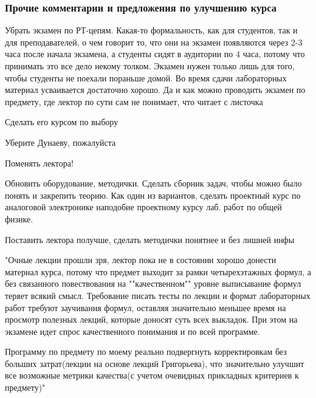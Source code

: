    
    \subsubsection{Прочие комментарии и предложения по улучшению курса}
		\begin{commentbox}
			Убрать экзамен по РТ-цепям. Какая-то формальность, как для студентов, так и для преподавателей, о чем говорит то, что они на экзамен появляются через 2-3 часа после начала экзамена, а студенты сидят в аудитории по 4 часа, потому что принимать это все дело некому толком. Экзамен нужен только лишь для того, чтобы студенты не поехали пораньше домой. Во время сдачи лабораторных материал усваивается достаточно хорошо. Да и как можно проводить экзамен по предмету, где лектор по сути сам не понимает, что читает с листочка
		\end{commentbox}

        \begin{commentbox}
            Сделать его курсом по выбору
        \end{commentbox}

        
        \begin{commentbox}
            Уберите Дунаеву, пожалуйста
        \end{commentbox}

        
        \begin{commentbox}
            Поменять лектора!
        \end{commentbox}

        
        \begin{commentbox}
            Обновить оборудование, методички. Сделать сборник задач, чтобы можно было понять и закрепить теорию. Как один из вариантов, сделать проектный курс по аналоговой электронике наподобие проектному курсу лаб. работ по общей физике.
        \end{commentbox}

        
        \begin{commentbox}
            Поставить лектора получше, сделать методички понятнее и без лишней инфы
        \end{commentbox}

        
        \begin{commentbox}
            "Очные лекции прошли зря, лектор пока не в состоянии хорошо донести материал курса, потому что предмет выходит за рамки четырехэтажных формул, а без связанного повествования на ""качественном"" уровне выписывание формул теряет всякий смысл. Требование писать тесты по лекции и формат лабораторных работ требуют заучивания формул, оставляя значительно меньшее время на просмотр полезных лекций, которые доносят суть всех выкладок. При этом на экзамене идет спрос качественного понимания и по всей программе.

            Программу по предмету по моему реально подвергнуть корректировкам без больших затрат(лекции на основе лекций Григорьева), что значительно улучшит все возможные метрики качества(с учетом очевидных прикладных критериев к предмету)"
        \end{commentbox}

